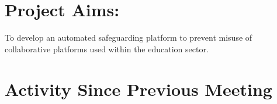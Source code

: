 
\section{Project Aims:} 


To develop an automated safeguarding platform to prevent misuse of collaborative platforms used within the education sector.

\section{Activity Since Previous Meeting}



